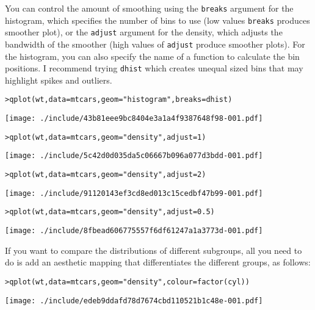 You can control the amount of smoothing using the {\tt breaks} argument for the histogram, which specifies the number of bins to use (low values {\tt breaks} produces smoother plot), or the {\tt adjust} argument for the density, which adjusts the bandwidth of the smoother (high values of {\tt adjust} produce smoother plots).  For the histogram, you can also specify the name of a function to calculate the bin positions.  I recommend trying {\tt dhist} which creates unequal sized bins that may highlight spikes and outliers.

\begin{alltt}
> qplot(wt, data = mtcars, geom = "histogram", breaks = dhist)
\end{alltt}
\texttt{[image: ./include/43b81eee9bc8404e3a1a4f9387648f98-001.pdf]}
\begin{alltt}

> qplot(wt, data = mtcars, geom = "density", adjust = 1)
\end{alltt}
\texttt{[image: ./include/5c42d0d035da5c06667b096a077d3bdd-001.pdf]}
\begin{alltt}

> qplot(wt, data = mtcars, geom = "density", adjust = 2)
\end{alltt}
\texttt{[image: ./include/91120143ef3cd8ed013c15cedbf47b99-001.pdf]}
\begin{alltt}

> qplot(wt, data = mtcars, geom = "density", adjust = 0.5)
\end{alltt}
\texttt{[image: ./include/8fbead606775557f6df61247a1a3773d-001.pdf]}
\begin{alltt}

\end{alltt}

If you want to compare the distributions of different subgroups, all you need to do is add an aesthetic mapping that differentiates the different groups, as follows:

\begin{alltt}
> qplot(wt, data=mtcars, geom="density", colour=factor(cyl))
\end{alltt}
\texttt{[image: ./include/edeb9ddafd78d7674cbd110521b1c48e-001.pdf]}
\begin{alltt}

\end{alltt}

